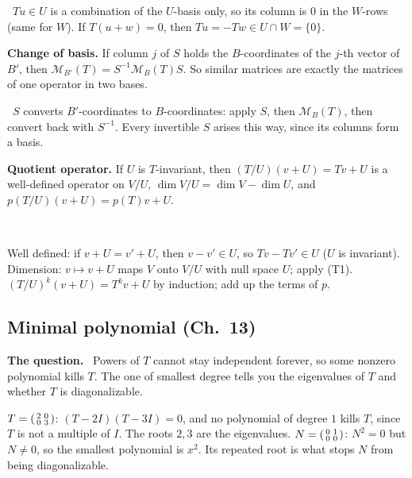 \documentclass[10pt]{scrartcl}
\newcommand{\MM}{\mathcal M}
\newcommand{\tool}[1]{\textbf{#1}}
\newcommand{\why}[1]{\par\vspace{2pt}{\color{OliveGreen!70!black}\textbf{Why.}}\ #1\par}
\newenvironment{qbox}{\begin{mdframed}[style=qboxstyle]\textbf{The question.}\ }{\end{mdframed}}
\newenvironment{steps}{\begin{enumerate}[label=\arabic*.,leftmargin=1.5em,itemsep=2pt,topsep=2pt]}{\end{enumerate}}
\begin{document}
\begin{enumerate}[label=(T\arabic*),leftmargin=2.6em,itemsep=8pt]
  \why{$Tu\in U$ is a combination of the $U$-basis only, so its column is $0$ in the $W$-rows (same for $W$). If $T(u+w)=0$, then $Tu=-Tw\in U\cap W=\{0\}$.}
  \ii \tool{Change of basis.} If column $j$ of $S$ holds the $B$-coordinates of the $j$-th vector of $B'$, then $\MM_{B'}(T)=S^{-1}\MM_B(T)S$. So similar matrices are exactly the matrices of one operator in two bases.
  \why{$S$ converts $B'$-coordinates to $B$-coordinates: apply $S$, then $\MM_B(T)$, then convert back with $S^{-1}$. Every invertible $S$ arises this way, since its columns form a basis.}
  \ii \tool{Quotient operator.} If $U$ is $T$-invariant, then $(T/U)(v+U)=Tv+U$ is a well-defined operator on $V/U$, $\dim V/U=\dim V-\dim U$, and $p(T/U)(v+U)=p(T)v+U$.
  \why{\begin{steps}
    \ii Well defined: if $v+U=v'+U$, then $v-v'\in U$, so $Tv-Tv'\in U$ ($U$ is invariant).
    \ii Dimension: $v\mapsto v+U$ maps $V$ onto $V/U$ with null space $U$; apply (T1).
    \ii $(T/U)^k(v+U)=T^kv+U$ by induction; add up the terms of $p$.
  \end{steps}}
\end{enumerate}

\subsection{Minimal polynomial (Ch.~13)}

\begin{qbox}
  Powers of $T$ cannot stay independent forever, so some nonzero polynomial kills $T$. The one of smallest degree tells you the eigenvalues of $T$ and whether $T$ is diagonalizable.
  \begin{itemize}
    \ii $T=\begin{psmallmatrix}2&0\\0&3\end{psmallmatrix}$: $(T-2I)(T-3I)=0$, and no polynomial of degree $1$ kills $T$, since $T$ is not a multiple of $I$. The roots $2,3$ are the eigenvalues.
    \ii $N=\begin{psmallmatrix}0&1\\0&0\end{psmallmatrix}$: $N^2=0$ but $N\ne0$, so the smallest polynomial is $x^2$. Its repeated root is what stops $N$ from being diagonalizable.
  \end{itemize}
\end{qbox}
\end{document}
